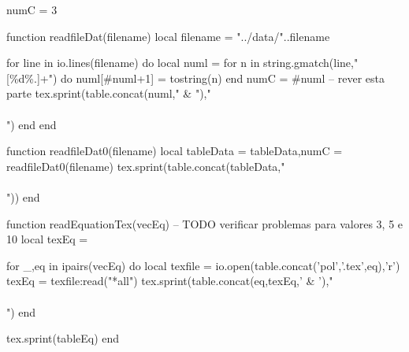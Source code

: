 

\begin{luacode}
  numC = 3

  function readfileDat(filename)
    local filename = "../data/"..filename

    for line in io.lines(filename) do
        local numl = {}
        for n in string.gmatch(line,"[\%d\%.]+") do
          numl[#numl+1] = tostring(n)
        end
        numC = #numl -- rever esta parte
        tex.sprint(table.concat(numl," & "),"\\\\")
    end
  end

  function readfileDat0(filename)
     local tableData = {}
     tableData,numC = readfileDat0(filename)
     tex.sprint(table.concat(tableData,"\\\\"))
  end

\end{luacode}

\newcommand{\luaTable}[5][\directlua{tex.print(numC)}]
{
  \begin{table}[H]
  \centering
  \label{#4}
  \caption{#3}
  \begin{tabular}{*{#1}{c}}
  \hline
  #5\\
  \hline
  \directlua{readfileDat('#2')}
  \hline
  \end{tabular}
  \end{table}
}



\begin{luacode}
  function readEquationTex(vecEq)
    -- TODO verificar problemas para valores 3, 5 e 10
    local texEq = {}

    for _,eq in ipairs(vecEq) do
      local texfile = io.open(table.concat({'pol','.tex'},eq),'r')
      texEq = texfile:read("*all")
      tex.sprint(table.concat({eq,texEq},' & ')," \\\\")
    end

    tex.sprint(tableEq)
  end
\end{luacode}

\newcommand{\polyTable}[3][tbPoly]
{
  \begin{table}[H]
    \label{#1}
    \centering
    \caption{#3}
    \begin{tabular}{c p{10cm}}
      \hline
      $i$ & $f_i(x)$\\
      \hline
      \directlua{readEquationTex({#2})}
      \hline
    \end{tabular}
  \end{table}
}

